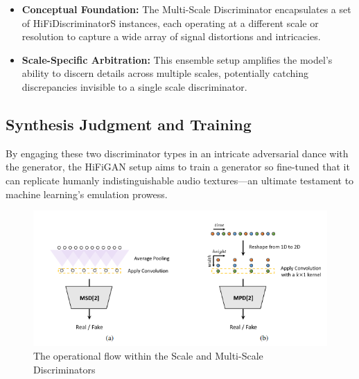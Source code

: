 \documentclass[a4paper]{article}
\begin{document}
\begin{itemize}
  \item \textbf{Conceptual Foundation:} The Multi-Scale Discriminator encapsulates a set of HiFiDiscriminatorS instances, each operating at a different scale or resolution to capture a wide array of signal distortions and intricacies.
  
  \item \textbf{Scale-Specific Arbitration:} This ensemble setup amplifies the model's ability to discern details across multiple scales, potentially catching discrepancies invisible to a single scale discriminator.
  
\end{itemize}

\subsection{Synthesis Judgment and Training}

By engaging these two discriminator types in an intricate adversarial dance with the generator, the HiFiGAN setup aims to train a generator so fine-tuned that it can replicate humanly indistinguishable audio textures—an ultimate testament to machine learning's emulation prowess.

\begin{figure}[ht]
  \centering
  \includegraphics[width=\linewidth]{hifigan-discriminators.png}
  \caption{The operational flow within the Scale and Multi-Scale Discriminators}
  \label{fig:hifigan-discriminators}
\end{figure}
\end{document}
